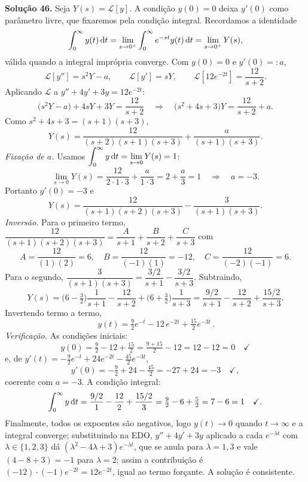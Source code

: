 \bigskip\noindent\textbf{Solução 46.}\quad
Seja $Y(s)=\mathcal{L}[y]$. A condição $y(0)=0$ deixa $y'(0)$ como parâmetro livre, que fixaremos pela condição integral. Recordamos a identidade
\[
\int_0^\infty y(t)\,\mathrm{d} t=\lim_{s\to0^+}\int_0^\infty e^{-st}y(t)\,\mathrm{d} t=\lim_{s\to0^+}Y(s),
\]
válida quando a integral imprópria converge. Com $y(0)=0$ e $y'(0)=:a$,
\[
\mathcal{L}[y'']=s^2Y-a,\qquad \mathcal{L}[y']=sY,\qquad \mathcal{L}[12 e^{-2t}]=\frac{12}{s+2}.
\]
Aplicando $\mathcal{L}$ a $y''+4y'+3y=12 e^{-2t}$:
\[
\big(s^2Y-a\big)+4sY+3Y=\frac{12}{s+2}
\quad\Longrightarrow\quad
\big(s^2+4s+3\big)Y=\frac{12}{s+2}+a.
\]
Como $s^2+4s+3=(s+1)(s+3)$,
\[
Y(s)=\frac{12}{(s+2)(s+1)(s+3)}+\frac{a}{(s+1)(s+3)}.
\]
\emph{Fixação de $a$.} Usamos $\displaystyle\int_0^\infty y\,\mathrm{d} t=\lim_{s\to0}Y(s)=1$:
\[
\lim_{s\to0}Y(s)=\frac{12}{2\cdot1\cdot3}+\frac{a}{1\cdot3}=2+\frac{a}{3}=1
\quad\Longrightarrow\quad a=-3.
\]
Portanto $y'(0)=-3$ e
\[
Y(s)=\frac{12}{(s+1)(s+2)(s+3)}-\frac{3}{(s+1)(s+3)}.
\]
\emph{Inversão.} Para o primeiro termo, $\dfrac{12}{(s+1)(s+2)(s+3)}=\dfrac{A}{s+1}+\dfrac{B}{s+2}+\dfrac{C}{s+3}$ com
\[
A=\frac{12}{(1)(2)}=6,\quad B=\frac{12}{(-1)(1)}=-12,\quad C=\frac{12}{(-2)(-1)}=6.
\]
Para o segundo, $\dfrac{3}{(s+1)(s+3)}=\dfrac{3/2}{s+1}-\dfrac{3/2}{s+3}$. Subtraindo,
\[
Y(s)=\Big(6-\tfrac32\Big)\frac{1}{s+1}-\frac{12}{s+2}+\Big(6+\tfrac32\Big)\frac{1}{s+3}
=\frac{9/2}{s+1}-\frac{12}{s+2}+\frac{15/2}{s+3}.
\]
Invertendo termo a termo,
\[
\boxed{\,y(t)=\tfrac92 e^{-t}-12\,e^{-2t}+\tfrac{15}{2}e^{-3t}\,}.
\]
\emph{Verificação.} As condições iniciais:
\[
y(0)=\tfrac92-12+\tfrac{15}{2}=\tfrac{9+15}{2}-12=12-12=0\quad\checkmark
\]
e, de $y'(t)=-\tfrac92 e^{-t}+24 e^{-2t}-\tfrac{45}{2}e^{-3t}$,
\[
y'(0)=-\tfrac92+24-\tfrac{45}{2}=-27+24=-3\quad\checkmark,
\]
coerente com $a=-3$. A condição integral:
\[
\int_0^\infty y\,\mathrm{d} t=\frac{9/2}{1}-\frac{12}{2}+\frac{15/2}{3}=\tfrac92-6+\tfrac52=7-6=1\quad\checkmark.
\]
Finalmente, todos os expoentes são negativos, logo $y(t)\to0$ quando $t\to\infty$ e a integral converge; substituindo na EDO, $y''+4y'+3y$ aplicado a cada $e^{-\lambda t}$ com $\lambda\in\{1,2,3\}$ dá $(\lambda^2-4\lambda+3)e^{-\lambda t}$, que se anula para $\lambda=1,3$ e vale $(4-8+3)=-1$ para $\lambda=2$; assim a contribuição é $(-12)\cdot(-1)e^{-2t}=12 e^{-2t}$, igual ao termo forçante. A solução é consistente.
